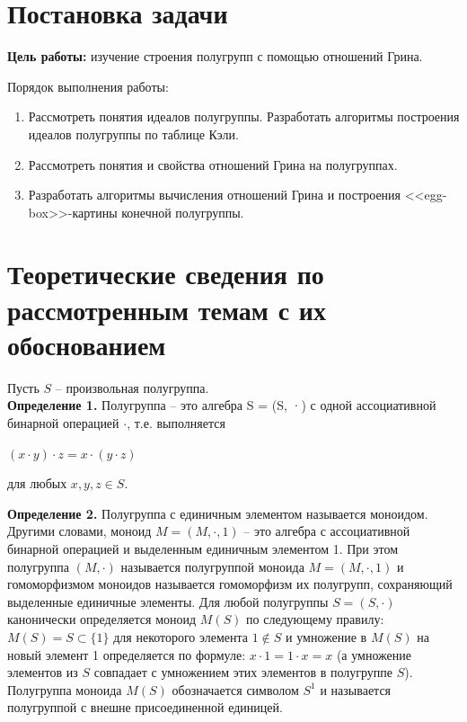 \documentclass[bachelor, och, labwork]{shiza}
\begin{document}

\section{Постановка задачи}

  \textbf{Цель работы:} изучение строения полугрупп с помощью отношений Грина.
  
  Порядок выполнения работы:
    \begin{enumerate}
        \item Рассмотреть понятия идеалов полугруппы. Разработать алгоритмы построения идеалов полугруппы по таблице Кэли.
        \item Рассмотреть понятия и свойства отношений Грина на полугруппах.
        \item Разработать алгоритмы вычисления отношений Грина и построения <<egg-box>>-картины конечной полугруппы.
    \end{enumerate}

\section{Теоретические сведения по рассмотренным темам с их обоснованием}

  Пусть $S$ -- произвольная полугруппа.\\
  \textbf{Определение 1.} Полугруппа – это алгебра S = (S, ·) с одной ассоциативной бинарной
    операцией $\cdot$, т.е. выполняется
      \begin{center}
        $(x \cdot y) \cdot z = x \cdot (y \cdot z)$
      \end{center}
    для любых $x,y,z \in S$.
    
    \textbf{Определение 2.} Полугруппа с единичным элементом называется моноидом. Другими словами, моноид $M = (M,\cdot,1)$ -- это алгебра с
    ассоциативной бинарной операцией и выделенным единичным элементом 1. При этом полугруппа $(M ,\cdot)$ называется полугруппой
    моноида $M = (M ,\cdot,1)$ и гомоморфизмом моноидов называется гомоморфизм их полугрупп, сохраняющий выделенные единичные элементы.
    Для любой полугруппы $S = (S ,\cdot)$ канонически определяется моноид $M(S)$ по следующему правилу: $M (S) = S \subset \{1\}$ для
    некоторого элемента $1 \notin S$ и умножение в $M (S)$ на новый элемент 1 определяется по формуле: $x \cdot 1 = 1 \cdot x = x$ (а умножение элементов из
    $S$ совпадает с умножением этих элементов в полугруппе $S$). Полугруппа моноида $M (S)$ обозначается символом $S^1$ и называется
    полугруппой с внешне присоединенной единицей.
\end{document}
